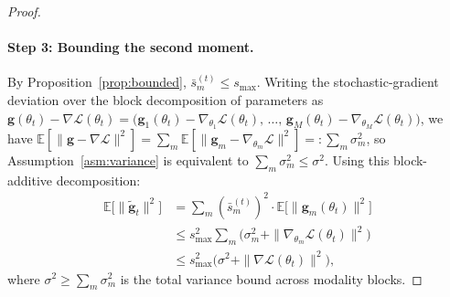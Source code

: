 \documentclass{article} %
\newcommand{\loss}{\mathcal{L}}
\begin{document}
\begin{proof}
\paragraph{Step 3: Bounding the second moment.}
By Proposition~\ref{prop:bounded}, $\bar{s}_m^{(t)} \leq s_{\max}$. Writing the stochastic-gradient deviation over the block decomposition of parameters as $\mathbf{g}(\theta_t) - \nabla \loss(\theta_t) = \bigl(\mathbf{g}_1(\theta_t) - \nabla_{\theta_1}\loss(\theta_t),\,\dots,\,\mathbf{g}_M(\theta_t) - \nabla_{\theta_M}\loss(\theta_t)\bigr)$, we have $\mathbb{E}[\|\mathbf{g} - \nabla\loss\|^{2}] = \sum_m \mathbb{E}[\|\mathbf{g}_m - \nabla_{\theta_m}\loss\|^{2}] =: \sum_m \sigma_m^{2}$, so Assumption~\ref{asm:variance} is equivalent to $\sum_m \sigma_m^{2} \leq \sigma^{2}$. Using this block-additive decomposition:
%
\begin{align}
\mathbb{E}\bigl[\|\tilde{\mathbf{g}}_t\|^2\bigr]
&= \sum_m (\bar{s}_m^{(t)})^2 \cdot \mathbb{E}\bigl[\|\mathbf{g}_m(\theta_t)\|^2\bigr] \nonumber \\
&\leq s_{\max}^2 \sum_m \bigl(\sigma_m^2 + \|\nabla_{\theta_m} \loss(\theta_t)\|^2\bigr) \nonumber \\
&\leq s_{\max}^2 \bigl(\sigma^2 + \|\nabla \loss(\theta_t)\|^2\bigr),
\label{eq:second_moment}
\end{align}
%
where $\sigma^2 \geq \sum_m \sigma_m^2$ is the total variance bound across modality blocks.


\end{proof}
\end{document}

